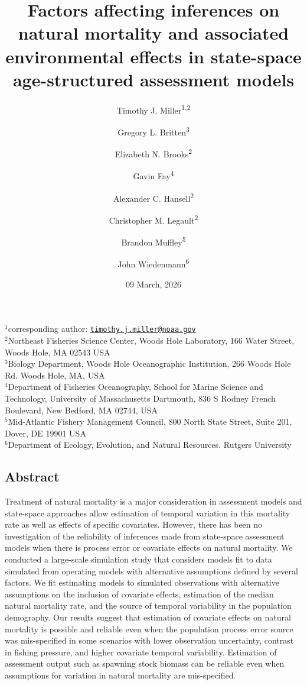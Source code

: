 \documentclass[
  12pt,
]{article}
\title{Factors affecting inferences on natural mortality and associated environmental effects in state-space age-structured assessment models}
\author{Timothy J. Miller\textsuperscript{1,2} \and Gregory L. Britten\textsuperscript{3} \and Elizabeth N. Brooks\textsuperscript{2} \and Gavin Fay\textsuperscript{4} \and Alexander C. Hansell\textsuperscript{2} \and Christopher M. Legault\textsuperscript{2} \and Brandon Muffley\textsuperscript{5} \and John Wiedenmann\textsuperscript{6}}
\date{09 March, 2026}
\begin{document}
\maketitle

\(^1\)corresponding author: \href{mailto:timothy.j.miller@noaa.gov}{\nolinkurl{timothy.j.miller@noaa.gov}}\\
\(^2\)Northeast Fisheries Science Center, Woods Hole Laboratory, 166 Water Street, Woods Hole, MA 02543 USA\\
\(^3\)Biology Department, Woods Hole Oceanographic Institution, 266 Woods Hole Rd. Woods Hole, MA, USA\\
\(^4\)Department of Fisheries Oceanography, School for Marine Science and Technology, University of Massachusetts Dartmouth, 836 S Rodney French Boulevard, New Bedford, MA 02744, USA\\
\(^5\)Mid-Atlantic Fishery Management Council, 800 North State Street, Suite 201, Dover, DE 19901 USA\\
\(^6\)Department of Ecology, Evolution, and Natural Resources. Rutgers University\\

\pagebreak

\subsection*{Abstract}\label{abstract}

Treatment of natural mortality is a major consideration in assessment models and state-space approaches allow estimation of temporal variation in this mortality rate as well as effects of specific covariates. However, there has been no investigation of the reliability of inferences made from state-space assessment models when there is process error or covariate effects on natural mortality. We conducted a large-scale simulation study that considers models fit to data simulated from operating models with alternative assumptions defined by several factors. We fit estimating models to simulated observations with alternative assumptions on the inclusion of covariate effects, estimation of the median natural mortality rate, and the source of temporal variability in the population demography. Our results suggest that estimation of covariate effects on natural mortality is possible and reliable even when the population process error source was mis-specified in some scenarios with lower observation uncertainty, contrast in fishing pressure, and higher covariate temporal variability. Estimation of assessment output such as spawning stock biomass can be reliable even when assumptions for variation in natural mortality are mis-specified.
\end{document}
